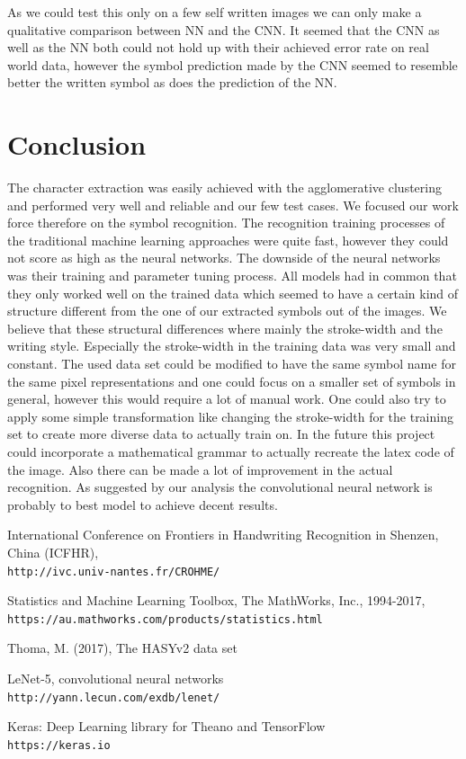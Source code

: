 \documentclass[twocolumn]{article}%
\begin{document}
	As we could test this only on a few self written images we can only make a qualitative comparison between NN and the CNN. It seemed that the CNN as well as the NN both could not hold up with their achieved error rate on real world data, however the symbol prediction made by the CNN seemed to resemble better the written symbol as does the prediction of the NN.
	
	\section{Conclusion}
	
	The character extraction was easily achieved with the agglomerative clustering and performed very well and reliable and our few test cases. We focused our work force therefore on the symbol recognition. The recognition training processes of the traditional machine learning approaches were quite fast, however they could not score as high as the neural networks. The downside of the neural networks was their training and parameter tuning process. All models had in common that they only worked well on the trained data which seemed to have a certain kind of structure different from the one of our extracted symbols out of the images. We believe that these structural differences where mainly the stroke-width and the writing style. Especially the stroke-width in the training data was very small and constant.
	The used data set could be modified to have the same symbol name for the same pixel representations and one could focus on a smaller set of symbols in general, however this would require a lot of manual work. One could also try to apply some simple transformation like changing the stroke-width for the training set to create more diverse data to actually train on.
	In the future this project could incorporate a mathematical grammar to actually recreate the latex code of the image. Also there can be made a lot of improvement in the actual recognition. As suggested by our analysis the convolutional neural network is probably to best model to achieve decent results.
	
	\begin{thebibliography}{9}
		International Conference on Frontiers in Handwriting Recognition in Shenzen, China (ICFHR),
		\\\texttt{http://ivc.univ-nantes.fr/CROHME/}
		
		Statistics and Machine Learning Toolbox, The MathWorks, Inc., 1994-2017,
		\\\texttt{https://au.mathworks.com/products/statistics.html}
		
		Thoma, M. (2017), The HASYv2 data set
		
		LeNet-5, convolutional neural networks
		\\\texttt{http://yann.lecun.com/exdb/lenet/}
		
		Keras: Deep Learning library for Theano and TensorFlow
		\\\texttt{https://keras.io}
		
		
	\end{thebibliography}
\end{document}
